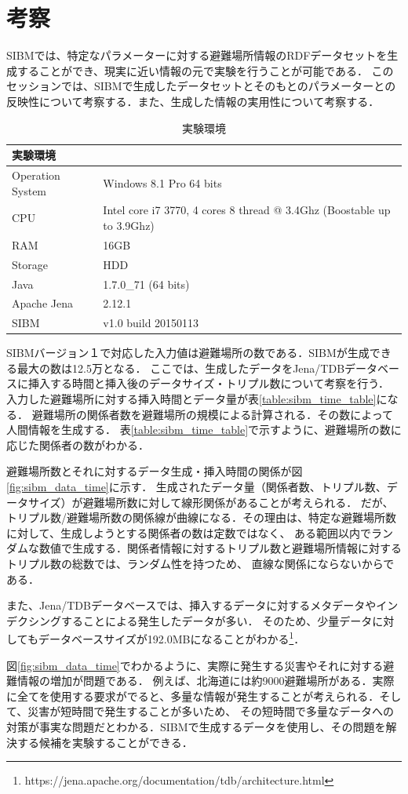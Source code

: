 \section{考察}

SIBMでは、特定なパラメーターに対する避難場所情報のRDFデータセットを生成することができ、現実に近い情報の元で実験を行うことが可能である．
このセッションでは、SIBMで生成したデータセットとそのもとのパラメーターとの反映性について考察する．また、生成した情報の実用性について考察する．

\begin{table}[h]
	\begin{center}
	\begin{tabular}{| l  p{45mm} |}
		\hline
		\rowstyle{\bfseries}
		実験環境 & \\
		\hline
		Operation System & Windows 8.1 Pro 64 bits \\
		CPU & Intel core i7 3770, 4 cores 8 thread @ 3.4Ghz (Boostable up to 3.9Ghz)
		\\
		RAM & 16GB \\
		Storage & HDD \\
		Java & 1.7.0\_71 (64 bits) \\
		Apache Jena & 2.12.1 \\
		SIBM & v1.0 build 20150113 \\
		\hline
	\end{tabular}
	\caption{実験環境}
	\label{table:sibm_env}
	\end{center}
\end{table}

SIBMバージョン１で対応した入力値は避難場所の数である．SIBMが生成できる最大の数は12.5万となる．
ここでは、生成したデータをJena/TDBデータベースに挿入する時間と挿入後のデータサイズ・トリプル数について考察を行う．
入力した避難場所に対する挿入時間とデータ量が表\ref{table:sibm_time_table}になる．
避難場所の関係者数を避難場所の規模による計算される．その数によって人間情報を生成する．
表\ref{table:sibm_time_table}で示すように、避難場所の数に応じた関係者の数がわかる．

避難場所数とそれに対するデータ生成・挿入時間の関係が図\ref{fig:sibm_data_time}に示す．
生成されたデータ量（関係者数、トリプル数、データサイズ）が避難場所数に対して線形関係があることが考えられる．
だが、トリプル数/避難場所数の関係線が曲線になる．その理由は、特定な避難場所数に対して、生成しようとする関係者の数は定数ではなく、
ある範囲以内でランダムな数値で生成する．関係者情報に対するトリプル数と避難場所情報に対するトリプル数の総数では、ランダム性を持つため、
直線な関係にならないからである．

また、Jena/TDBデータベースでは、挿入するデータに対するメタデータやインデクシングすることによる発生したデータが多い．
そのため、少量データに対してもデータベースサイズが192.0MBになることがわかる\footnote{https://jena.apache.org/documentation/tdb/architecture.html}．

図\ref{fig:sibm_data_time}でわかるように、実際に発生する災害やそれに対する避難情報の増加が問題である．
例えば、北海道には約9000避難場所がある．実際に全てを使用する要求がでると、多量な情報が発生することが考えられる．そして、災害が短時間で発生することが多いため、
その短時間で多量なデータへの対策が事実な問題だとわかる．SIBMで生成するデータを使用し、その問題を解決する候補を実験することができる．
